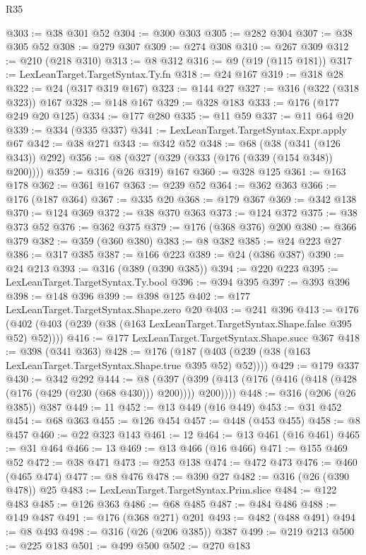 \begin{lexlean}{R35}
\begin{coremodule}
@303 := @38 @301 @52
@304 := @300 @303
@305 := @282 @304
@307 := @38 @305 @52
@308 := @279 @307
@309 := @274 @308
@310 := @267 @309
@312 := @210 (@218 @310)
@313 := @8 @312
@316 := @9 (@19 (@115 @181))
@317 := LexLeanTarget.TargetSyntax.Ty.fn
@318 := @24 @167
@319 := @318 @28
@322 := @24 (@317 @319 @167)
@323 := @144 @27
@327 := @316 (@322 (@318 @323)) @167
@328 := @148 @167
@329 := @328 @183
@333 := @176 (@177 @249 @20 @125)
@334 := @177 @280
@335 := @11 @59
@337 := @11 @64 @20
@339 := @334 (@335 @337)
@341 := LexLeanTarget.TargetSyntax.Expr.apply @67
@342 := @38 @271
@343 := @342 @52
@348 := @68 (@38 (@341 (@126 @343)) @292)
@356 := @8 (@327 (@329 (@333 (@176 (@339 (@154 @348)) @200))))
@359 := @316 (@26 @319) @167
@360 := @328 @125
@361 := @163 @178
@362 := @361 @167
@363 := @239 @52
@364 := @362 @363
@366 := @176 (@187 @364)
@367 := @335 @20
@368 := @179 @367
@369 := @342 @138
@370 := @124 @369
@372 := @38 @370 @363
@373 := @124 @372
@375 := @38 @373 @52
@376 := @362 @375
@379 := @176 (@368 @376) @200
@380 := @366 @379
@382 := @359 (@360 @380)
@383 := @8 @382
@385 := @24 @223 @27
@386 := @317 @385
@387 := @166 @223
@389 := @24 (@386 @387)
@390 := @24 @213
@393 := @316 (@389 (@390 @385))
@394 := @220 @223
@395 := LexLeanTarget.TargetSyntax.Ty.bool
@396 := @394 @395
@397 := @393 @396
@398 := @148 @396
@399 := @398 @125
@402 := @177 LexLeanTarget.TargetSyntax.Shape.zero @20
@403 := @241 @396
@413 := @176 (@402 (@403 (@239 (@38 (@163 LexLeanTarget.TargetSyntax.Shape.false @395 @52) @52))))
@416 := @177 LexLeanTarget.TargetSyntax.Shape.succ @367
@418 := @398 (@341 @363)
@428 := @176 (@187 (@403 (@239 (@38 (@163 LexLeanTarget.TargetSyntax.Shape.true @395 @52) @52))))
@429 := @179 @337
@430 := @342 @292
@444 := @8
    (@397 (@399 (@413 (@176 (@416 (@418 (@428 (@176 (@429 (@230 (@68 @430))) @200)))) @200))))
@448 := @316 (@206 (@26 @385)) @387
@449 := 11
@452 := @13 @449 (@16 @449)
@453 := @31 @452
@454 := @68 @363
@455 := @126 @454
@457 := @448 (@453 @455)
@458 := @8 @457
@460 := @22 @323 @143
@461 := 12
@464 := @13 @461 (@16 @461)
@465 := @31 @464
@466 := 13
@469 := @13 @466 (@16 @466)
@471 := @155 @469 @52
@472 := @38 @471
@473 := @253 @138
@474 := @472 @473
@476 := @460 (@465 @474)
@477 := @8 @476
@478 := @390 @27
@482 := @316 (@26 (@390 @478)) @25
@483 := LexLeanTarget.TargetSyntax.Prim.slice
@484 := @122 @483
@485 := @126 @363
@486 := @68 @485
@487 := @484 @486
@488 := @149 @487
@491 := @176 (@368 @271) @201
@493 := @482 (@488 @491)
@494 := @8 @493
@498 := @316 (@26 (@206 @385)) @387
@499 := @219 @213
@500 := @225 @183
@501 := @499 @500
@502 := @270 @183

\end{coremodule}
\end{lexlean}
